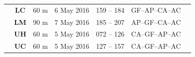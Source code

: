 \documentclass{sfuthesis}
\begin{document}
\begin{landscape}
\begin{table}[]
\begin{tabular}{ccccccl}
                                                                             & \textbf{LC}                                                  & 60 m                                                                     & 6 May 2016    & 159 -- 184                                                                 & GF--AP--CA--AC                                                     &                                                                                                                                                                                                                                                  \\
                                                                             & \textbf{LM}                                                  & 90 m                                                                     & 7 May 2016    & 185 -- 207                                                                 & AP--GF--CA--AC                                                     &                                                                                                                                                                                                                                                  \\
                                                                             & \textbf{UH}                                                  & 60 m                                                                     & 5 May 2016    & 072 -- 126                                                                 & CA--GF--AP--AC                                                     &                                                                                                                                                                                                                                                  \\
                                                                             & \textbf{UC}                                                  & 60 m                                                                     & 5 May 2016    & 127 -- 157                                                                 & CA--GF--AP--AC                                                     &                                                                                                                                                                                                                                                  \\

\end{tabular}
\end{table}
\end{landscape}
\end{document}
